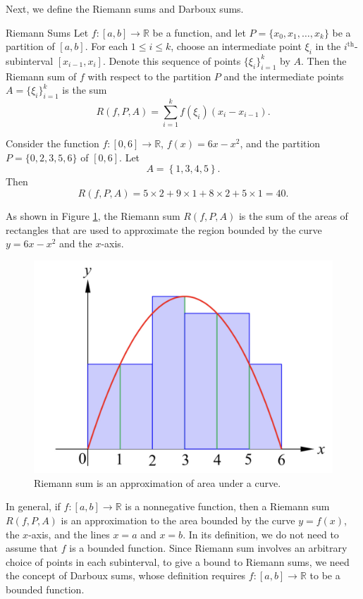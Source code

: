 Next, we define the Riemann sums and Darboux sums.

\begin{definition}{Riemann Sums}
Let $f:[a,b]\to \mathbb{R}$ be a   function, and let $P=\{x_0, x_1, \ldots, x_k\}$ be a partition of $[a, b]$. For each $1\leq i\leq k$, choose an intermediate point $\xi_i$ in the $i^{\text{th}}$-subinterval $[x_{i-1}, x_i]$. Denote this sequence of points    $\{\xi_i\}_{i=1}^k$ by $A$. Then the Riemann sum of $f$ with respect to the partition $P$ and the intermediate points $A=\{\xi_i\}_{i=1}^k$ is the sum
\[R(f, P, A)=\sum_{i=1}^kf(\xi_i)(x_i-x_{i-1}).\]
\end{definition}

\begin{example}[label=ex230220_1]{}
Consider the function $f:[0, 6]\to\mathbb{R}$, $f(x)=6x-x^2$, and the partition  $P=\{0, 2, 3, 5, 6\}$ of $[0, 6]$. Let 
\[A=\left\{1, 3, 4, 5\right\}.\]Then 
\[R(f, P, A)=5\times 2+9\times 1+8\times 2+5\times   1=40.\]
\end{example}
As shown in Figure \ref{figure37}, the Riemann sum $R(f, P, A)$ is the sum of the areas of rectangles that are used to approximate the region bounded by the curve $y=6x-x^2$ and the $x$-axis. 

 \begin{figure}[ht]
\centering
\includegraphics[scale=0.2]{Picture37.png}
\caption{Riemann sum is an approximation of area under a curve.\fa}\label{figure37}
\end{figure}

In general, if $f:[a,b]\to\mathbb{R}$ is a nonnegative function, then a Riemann sum $R(f, P, A)$ is an approximation to the area bounded by the curve $y=f(x)$, the $x$-axis, and the lines $x=a$ and $x=b$. In its definition, we do not need to assume that $f$ is a bounded function. 
Since Riemann sum involves an arbitrary choice of points in each subinterval, to give a bound to Riemann sums, we need the concept of Darboux sums, whose definition requires $f:[a,b]\to\mathbb{R}$ to be a bounded function.

